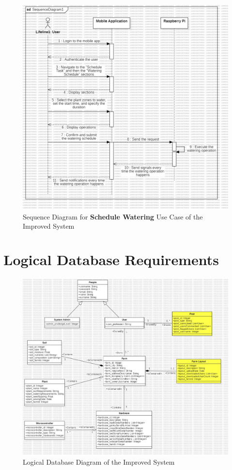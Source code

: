 \begin{figure}[htbp]
    \centering
    \includegraphics[width=1\linewidth]{Figures/schedule_watering_sequence_diagram.jpg}
    \caption{Sequence Diagram for \textbf{Schedule Watering} Use Case of the Improved System}
    \label{ScheduleWateringSequenceDiagram}
\end{figure}

\newpage

\section{Logical Database Requirements}
\begin{figure}[htbp]
    \centering
    \includegraphics[width=1\linewidth]{Figures/improved_logical_database_diagram.jpg}
    \caption{Logical Database Diagram of the Improved System}
    \label{LogicalDatabaseImproved}
\end{figure}

